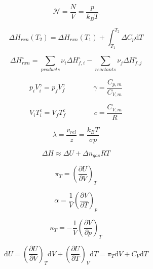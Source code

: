 \documentclass[12pt, letterpaper]{memoir}
\begin{document}
\noindent
\begin{minipage}{0.5\linewidth}
	\begin{equation*}
		\mathcal{N} = \frac{N}{V}=\frac{p}{k_BT}
	\end{equation*}

	\begin{equation*}
		\Delta H_{rxn}(T_2) = \Delta H_{rxn}(T_1) + \int_{T_1}^{T_2} \! \Delta C_{p}\mathrm{d}T
	\end{equation*}

	\begin{equation*}
		\Delta H^\circ_{rxn} = \sum\limits_{products} \nu_i\Delta H^\circ_{f,i} - \sum\limits_{reactants} \nu_j\Delta H^\circ_{f,j}
	\end{equation*}

	\begin{equation*}
		p_iV_i^\gamma = p_fV_f^\gamma \hspace{4em} \gamma = \dfrac{C_{p,m}}{C_{V,m}}
	\end{equation*}

	\begin{equation*}
		V_iT_i^c=V_fT_f^c \hspace{4em} c=\dfrac{C_{V,m}}{R}
	\end{equation*}
\end{minipage}
\begin{minipage}{0.5\linewidth}
	\begin{equation*}
		\lambda = \dfrac{v_{rel}}{z}=\frac{k_BT}{\sigma p}
	\end{equation*}

	\begin{equation*}
		\Delta H \approx \Delta U + \Delta n_{gas}RT
	\end{equation*}

	\begin{equation*}
		\pi_T=\left(\frac{\partial U}{\partial V}\right)_{\!\!T}
	\end{equation*}

	\begin{equation*}
		\alpha=\frac{1}{V}\left(\dfrac{\partial V}{\partial T}\right)_{\!\!p}
	\end{equation*}

	\begin{equation*}
		\kappa_T=-\frac{1}{V}\left(\dfrac{\partial V}{\partial p}\right)_{\!\!T}
	\end{equation*}
\end{minipage}

\begin{equation*}
	\mathrm{d}U=\left(\dfrac{\partial U}{\partial V}\right)_{\!\!T}\mathrm{d}V + \left(\dfrac{\partial U}{\partial T}\right)_{\!\!V}\mathrm{d}T=\pi_T\mathrm{d}V + C_V\mathrm{d}T
\end{equation*}
\end{document}

